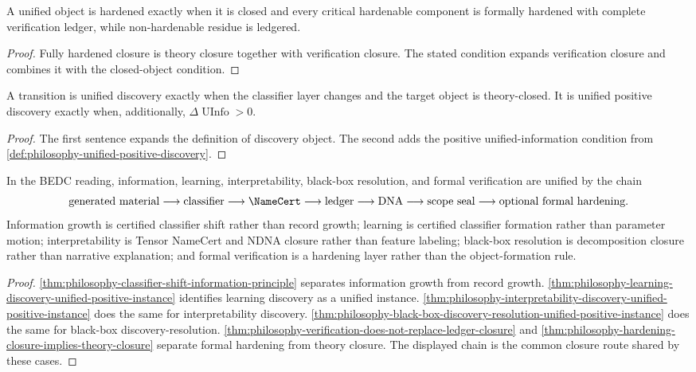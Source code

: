\begin{theorem}
\label{thm:philosophy-unified-hardening-theorem}
A unified object is hardened exactly when it is closed and every critical
hardenable component is formally hardened with complete verification
ledger, while non-hardenable residue is ledgered.
\end{theorem}
\begin{proof}
Fully hardened closure is theory closure together with verification
closure. The stated condition expands verification closure and combines
it with the closed-object condition.
\end{proof}

\begin{theorem}
\label{thm:philosophy-unified-discovery-theorem}
A transition is unified discovery exactly when the classifier layer
changes and the target object is theory-closed. It is unified positive
discovery exactly when, additionally,
$\Delta\operatorname{UInfo}>0$.
\end{theorem}
\begin{proof}
The first sentence expands the definition of discovery object. The
second adds the positive unified-information condition from
\autoref{def:philosophy-unified-positive-discovery}.
\end{proof}

\begin{theorem}
\label{thm:philosophy-unified-bedc-information-theorem}
In the BEDC reading, information, learning, interpretability,
black-box resolution, and formal verification are unified by the chain
$$
\text{generated material}
\longrightarrow
\text{classifier}
\longrightarrow
\NameCert
\longrightarrow
\text{ledger}
\longrightarrow
\text{DNA}
\longrightarrow
\text{scope seal}
\longrightarrow
\text{optional formal hardening}.
$$
Information growth is certified classifier shift rather than record
growth; learning is certified classifier formation rather than parameter
motion; interpretability is Tensor NameCert and NDNA closure rather than
feature labeling; black-box resolution is decomposition closure rather
than narrative explanation; and formal verification is a hardening layer
rather than the object-formation rule.
\end{theorem}
\begin{proof}
\autoref{thm:philosophy-classifier-shift-information-principle}
separates information growth from record growth.
\autoref{thm:philosophy-learning-discovery-unified-positive-instance}
identifies learning discovery as a unified instance.
\autoref{thm:philosophy-interpretability-discovery-unified-positive-instance}
does the same for interpretability discovery.
\autoref{thm:philosophy-black-box-discovery-resolution-unified-positive-instance}
does the same for black-box discovery-resolution.
\autoref{thm:philosophy-verification-does-not-replace-ledger-closure}
and
\autoref{thm:philosophy-hardening-closure-implies-theory-closure}
separate formal hardening from theory closure. The displayed chain is
the common closure route shared by these cases.
\end{proof}
